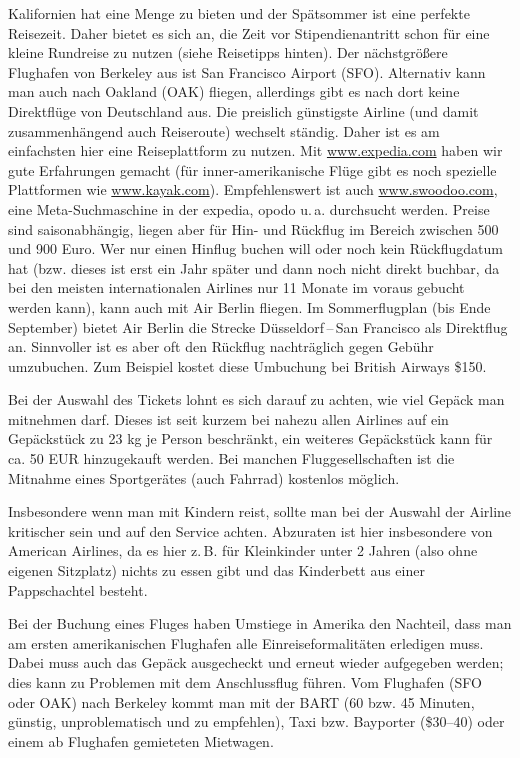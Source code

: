\documentclass[a4paper]{scrreprt}
\begin{document}
Kalifornien hat eine Menge zu bieten und der Spätsommer ist eine perfekte Reisezeit. Daher bietet es sich an, die Zeit vor Stipendienantritt schon für eine kleine Rundreise zu nutzen (siehe Reisetipps hinten). Der nächstgrößere Flughafen von Berkeley aus ist San Francisco Airport (SFO). Alternativ kann man auch nach Oakland (OAK) fliegen, allerdings gibt es nach dort keine Direktflüge von Deutschland aus. Die preislich günstigste Airline (und damit zusammenhängend auch Reiseroute) wechselt ständig. Daher ist es am einfachsten hier eine Reiseplattform zu nutzen. Mit \url{www.expedia.com} haben wir gute Erfahrungen gemacht (für inner-amerikanische Flüge gibt es noch spezielle Plattformen wie  \url{www.kayak.com}). Empfehlenswert ist auch  \url{www.swoodoo.com}, eine Meta-Suchmaschine in der expedia, opodo u.\,a. durchsucht werden. Preise sind saisonabhängig, liegen aber für Hin- und Rückflug im Bereich zwischen 500 und 900 Euro. Wer nur einen Hinflug buchen will oder noch kein Rückflugdatum hat (bzw. dieses ist erst ein Jahr später und dann noch nicht direkt buchbar, da bei den meisten internationalen Airlines nur 11 Monate im voraus gebucht werden kann), kann auch mit Air Berlin fliegen. Im Sommerflugplan (bis Ende September) bietet Air Berlin die Strecke Düsseldorf\,--\,San Francisco als Direktflug an. Sinnvoller ist es aber oft den Rückflug nachträglich gegen Gebühr umzubuchen. Zum Beispiel kostet diese Umbuchung bei British Airways \$150. 

Bei der Auswahl des Tickets lohnt es sich darauf zu achten, wie viel Gepäck man mitnehmen darf. Dieses ist seit kurzem bei nahezu allen Airlines auf ein Gepäckstück zu 23 kg je Person beschränkt, ein weiteres Gepäckstück kann für ca. 50 EUR hinzugekauft werden. Bei manchen Fluggesellschaften ist die Mitnahme eines Sportgerätes (auch Fahrrad) kostenlos möglich.

Insbesondere wenn man mit Kindern reist, sollte man bei der Auswahl der Airline kritischer sein und auf den Service achten. Abzuraten ist hier insbesondere von American Airlines, da es hier z.\,B. für Kleinkinder unter 2 Jahren (also ohne eigenen Sitzplatz) nichts zu essen gibt und das Kinderbett aus einer Pappschachtel besteht.

Bei der Buchung eines Fluges haben Umstiege in Amerika den Nachteil, dass man am ersten amerikanischen Flughafen alle Einreiseformalitäten erledigen muss. Dabei muss auch das Gepäck ausgecheckt und erneut wieder aufgegeben werden; dies kann zu Problemen mit dem Anschlussflug führen. Vom Flughafen (SFO oder OAK) nach Berkeley kommt man mit der BART (60 bzw. 45 Minuten, günstig, unproblematisch und zu empfehlen), Taxi bzw. Bayporter (\$30--40) oder einem ab Flughafen gemieteten Mietwagen.
 
\end{document}

